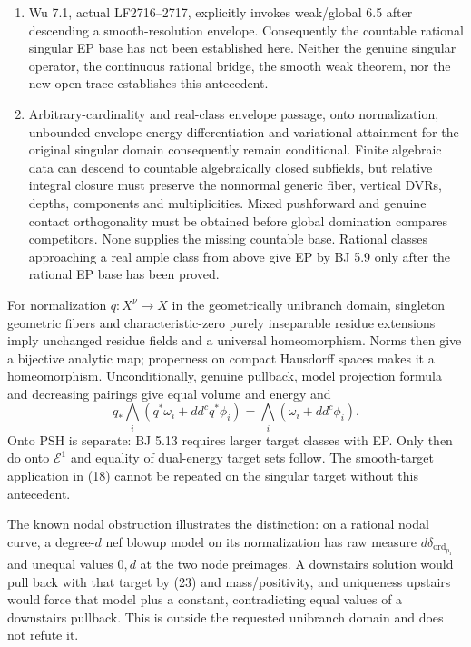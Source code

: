 \documentclass[
  10pt,
]{article}
\begin{document}
\begin{enumerate}
  polynomial opens, common approximation neighborhoods, and global
  upper-growth collar control; the printed identity between the interior
  of a weak polytope and strict constraints fails for constant
  constraints. The finite-projection geometry in 6.16 and every step of
  the singular-stratum induction 6.3--6.5 still require a complete
  repaired proof. We have not asserted these by citation to the
  diagnostic source.
\item
  Wu 7.1, actual LF2716--2717, explicitly invokes weak/global 6.5 after
  descending a smooth-resolution envelope. Consequently the countable
  rational singular EP base has not been established here. Neither the
  genuine singular operator, the continuous rational bridge, the smooth
  weak theorem, nor the new open trace establishes this antecedent.
\item
  Arbitrary-cardinality and real-class envelope passage, onto
  normalization, unbounded envelope-energy differentiation and
  variational attainment for the original singular domain consequently
  remain conditional. Finite algebraic data can descend to countable
  algebraically closed subfields, but relative integral closure must
  preserve the nonnormal generic fiber, vertical DVRs, depths,
  components and multiplicities. Mixed pushforward and genuine contact
  orthogonality must be obtained before global domination compares
  competitors. None supplies the missing countable base. Rational
  classes approaching a real ample class from above give EP by BJ 5.9
  only after the rational EP base has been proved.
\end{enumerate}

For normalization \(q:X^\nu\to X\) in the geometrically unibranch
domain, singleton geometric fibers and characteristic-zero purely
inseparable residue extensions imply unchanged residue fields and a
universal homeomorphism. Norms then give a bijective analytic map;
properness on compact Hausdorff spaces makes it a homeomorphism.
Unconditionally, genuine pullback, model projection formula and
decreasing pairings give equal volume and energy and
\[q_*\bigwedge_i(q^*\omega_i+dd^cq^*\phi_i)
 =\bigwedge_i(\omega_i+dd^c\phi_i). \tag{23}\] Onto PSH is separate: BJ
5.13 requires larger target classes with EP. Only then do onto
\(\mathcal E^1\) and equality of dual-energy target sets follow. The
smooth-target application in (18) cannot be repeated on the singular
target without this antecedent.

The known nodal obstruction illustrates the distinction: on a rational
nodal curve, a degree-\(d\) nef blowup model on its normalization has
raw measure \(d\delta_{\operatorname{ord}_{p_1}}\) and unequal values
\(0,d\) at the two node preimages. A downstairs solution would pull back
with that target by (23) and mass/positivity, and uniqueness upstairs
would force that model plus a constant, contradicting equal values of a
downstairs pullback. This is outside the requested unibranch domain and
does not refute it.
\end{document}
